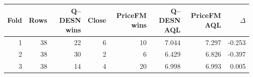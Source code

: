 \begin{tabular}{rrrrrrrr}
\toprule
Fold & Rows & Q--DESN wins & Close & PriceFM wins & Q--DESN AQL & PriceFM AQL & $\Delta$ \\
\midrule
1 & 38 & 22 & 6 & 10 & 7.044 & 7.297 & -0.253 \\
2 & 38 & 30 & 2 & 6 & 6.429 & 6.826 & -0.397 \\
3 & 38 & 14 & 4 & 20 & 6.998 & 6.993 & 0.005 \\
\bottomrule
\end{tabular}
